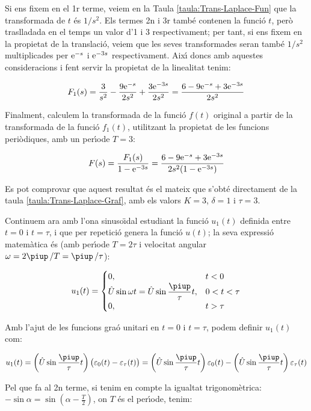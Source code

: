 \begin{exemple}
    Si ens fixem en el 1r terme, veiem en la Taula
    \vref{taula:Trans-Laplace-Fun} que la  transformada de $t$ \'{e}s $1/s^2$.
    Els termes 2n i 3r tamb\'{e} contenen la funci\'{o} $t$, per\`{o} traslladada
    en el temps un valor d'1 i 3 respectivament; per tant, si ens fixem
    en la propietat de la translaci\'{o}, veiem que les seves transformades
    seran tamb\'{e} $1/s^2$ multiplicades per $\mathrm{e}^{-s}$ i $\mathrm{e}^{-3s}$
    respectivament. Aix\'{\i} doncs amb aquestes consideracions i fent
    servir la propietat de la linealitat tenim:

    \[
        F_1(s) = \frac{3}{s^2} - \frac{9 \mathrm{e}^{-s}}{2 s^2} + \frac{3 \mathrm{e}^{-3s}}{2
        s^2} =\frac{6-9\mathrm{e}^{-s}+3\mathrm{e}^{-3s}}{2s^2}
    \]

    Finalment, calculem la transformada de la funci\'{o} $f(t)$ original a
    partir de la transformada de la funci\'{o} $f_1(t)$, utilitzant la
    propietat de les funcions peri\`{o}diques, amb un per\'{\i}ode $T=3$:

    \[
        F(s) = \frac{F_1(s)}{1-\mathrm{e}^{-3s}} = \frac{6-9\mathrm{e}^{-s}+3\mathrm{e}^{-3s}}{2s^2(1-\mathrm{e}^{-3s}) }
    \]

    Es pot comprovar que aquest resultat \'{e}s el mateix que s'obt\'{e} directament de la taula \vref{taula:Trans-Laplace-Graf}, amb els valors $K=3$, $\delta=1$ i $\tau=3$.

    Continuem ara  amb l'ona sinuso\"{\i}dal estudiant la funci\'{o} $u_1(t)$
    definida entre $t=0$ i $t=\tau$, i que per repetici\'{o} genera la
    funci\'{o} $u(t)$; la seva expressi\'{o} matem\`{a}tica \'{e}s (amb per\'{\i}ode $T=
    2\tau$ i velocitat angular $\omega= 2\piup\,/T  = \piup\,/\tau$):

    \[
        u_1(t) = \begin{cases} 0, & t < 0\\ \hat{U}\sin\omega t =
        \hat{U}\sin\dfrac{\piup}{\tau}t,  & 0<t<\tau \\ 0, & t > \tau \end{cases}
    \]


    Amb l'ajut de les funcions gra\'{o} unitari en $t=0$ i $t=\tau$, podem
    definir $u_1(t)$ com:

    \[
        u_1(t)=\left(\hat{U}\sin\frac{\piup}{\tau}t\right)\bigl(\varepsilon_0(t)-\varepsilon_\tau(t)\bigr)
        =\left(\hat{U}\sin\frac{\piup}{\tau}t\right)\varepsilon_0(t) - \left(\hat{U}\sin\frac{\piup}{\tau}t\right)\varepsilon_\tau(t)
    \]

    Pel que fa al 2n  terme, si tenim en compte la igualtat
    trigonom\`{e}trica: $-\sin \alpha = \sin(\alpha-\frac{T}{2})$, on $T$ \'{e}s
    el per\'{\i}ode, tenim:


\end{exemple}
